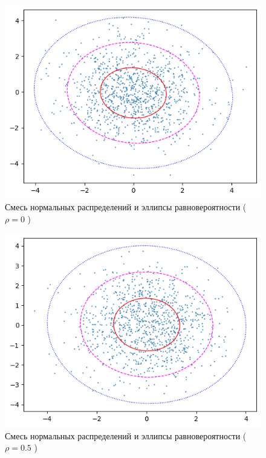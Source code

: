 \documentclass[12pt,a4paper]{article}
\begin{document}
	\begin{figure}[htbp!]
		\begin{center}
			\includegraphics[width = 0.8\linewidth]{graphics/lab5_ellips_1.png}
			\caption{Смесь нормальных распределений и эллипсы равновероятности
			( \( \rho = 0 \) )}
		\end{center}
	\end{figure}

	\begin{figure}[htbp!]
		\begin{center}
			\includegraphics[width = 0.8\linewidth]{graphics/lab5_ellips_2.png}
			\caption{Смесь нормальных распределений и эллипсы равновероятности
			( \( \rho = 0.5 \) )}
		\end{center}
	\end{figure}
\end{document}
